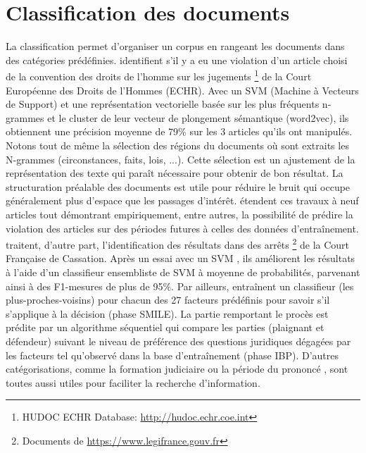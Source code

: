 \section{Classification des documents}
La classification permet d'organiser un corpus en rangeant les documents dans des catégories prédéfinies.  \cite{Aletras2016predictDecisionECHR} identifient s'il y a eu une violation d'un article choisi de la convention des droits de l'homme sur les jugements \footnote{HUDOC ECHR Database: \url{http://hudoc.echr.coe.int}} de la Court Européenne des Droits de l'Hommes (ECHR). Avec un SVM (Machine à Vecteurs de Support) et une représentation vectorielle basée sur les plus fréquents n-grammes et le cluster de leur vecteur de plongement sémantique (word2vec), ils obtiennent une précision moyenne de 79\% sur les 3 articles qu'ils ont manipulés. Notons tout de même la sélection des régions du documents où sont extraits les N-grammes (circonstances, faits, lois, ...). Cette sélection est un ajustement de la représentation des texte qui paraît nécessaire pour obtenir de bon résultat. La structuration préalable des documents est utile pour réduire le bruit qui occupe généralement plus d'espace que les passages d'intérêt.  \citet{medvedeva2018echrCristalBall} étendent ces travaux à neuf articles tout démontrant empiriquement, entre autres, la possibilité de prédire la violation des articles sur des périodes futures à celles des données d'entraînement. \cite{sulea2017legalEnsSVM} traitent, d'autre part, l'identification des résultats dans des arrêts \footnote{Documents de \url{https://www.legifrance.gouv.fr}} de la Court Française de Cassation. Après un essai avec un SVM \citep{Sulea2017predictareadecision}, ils améliorent les résultats à l'aide d'un classifieur ensembliste de SVM à moyenne de probabilités, parvenant ainsi à des F1-mesures de plus de 95\%.  Par ailleurs, \cite{Ashley2009classifCases} entraînent un classifieur (les plus-proches-voisins) pour chacun des 27 facteurs prédéfinis pour savoir s'il s'applique à la décision (phase SMILE). La partie remportant le procès est prédite par un algorithme séquentiel qui compare les parties (plaignant et défendeur) suivant le niveau de préférence des questions juridiques dégagées par les facteurs tel qu'observé dans la base d'entraînement (phase IBP).  D'autres catégorisations, comme la formation judiciaire ou la période du prononcé \citep{Sulea2017predictareadecision,sulea2017legalEnsSVM}, sont toutes aussi utiles pour faciliter la recherche d'information.

